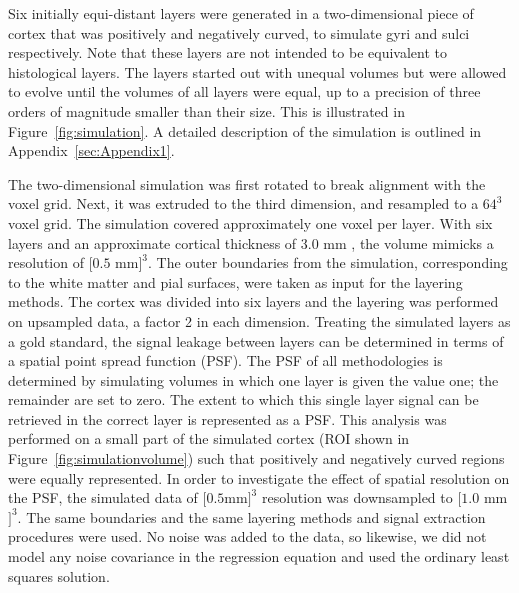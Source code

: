 Six initially equi-distant layers were generated in a two-dimensional piece of cortex that was positively and negatively curved, to simulate gyri and sulci respectively. Note that these layers are not intended to be equivalent to histological layers. The layers started out with unequal volumes but were allowed to evolve until the volumes of all layers were equal, up to a precision of three orders of magnitude smaller than their size. This is illustrated in Figure~\ref{fig:simulation}. A detailed description of the simulation is outlined in Appendix~\ref{sec:Appendix1}.


The two-dimensional simulation was first rotated to break alignment with the voxel grid. Next, it was extruded to the third dimension, and resampled to a $64^3$ voxel grid. The simulation covered approximately one voxel per layer. With six layers and an approximate cortical thickness of 3.0 mm \cite{Zilles1990,Fischl2000}, the volume mimicks a resolution of $[0.5$ mm$]^3$. The outer boundaries from the simulation, corresponding to the white matter and pial surfaces, were taken as input for the layering methods. The cortex was divided into six layers and the layering was performed on upsampled data, a factor 2 in each dimension. Treating the simulated layers as a gold standard, the signal leakage between layers can be determined in terms of a spatial point spread function (PSF). The PSF of all methodologies is determined by simulating volumes in which one layer is given the value one; the remainder are set to zero. The extent to which this single layer signal can be retrieved in the correct layer is represented as a PSF. This analysis was performed on a small part of the simulated cortex (ROI shown in Figure~\ref{fig:simulationvolume}) such that positively and negatively curved regions were equally represented. In order to investigate the effect of spatial resolution on the PSF, the simulated data of $[0.5 $mm$]^3$ resolution was downsampled to $[1.0$ mm$]^3$. The same boundaries and the same layering methods and signal extraction procedures were used. No noise was added to the data, so likewise, we did not model any noise covariance in the regression equation and used the ordinary least squares solution.


